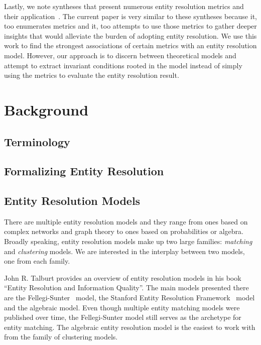 \documentclass[journal]{IEEEtran}
\begin{document}
    Lastly, we note syntheses that present numerous entity resolution metrics
    and their application~\cite{hitesh2012,graf2021frost,barnes2015practioner}.
    The current paper is very similar to these syntheses because it, too
    enumerates metrics and it, too attempts to use those metrics to gather
    deeper insights that would alleviate the burden of adopting entity
    resolution.
    We use this work to find the strongest associations of certain metrics with
    an entity resolution model.
    However, our approach is to discern between theoretical models and attempt
    to extract invariant conditions rooted in the model instead of simply using
    the metrics to evaluate the entity resolution result.

    \section{Background}\label{sec:Theoretical Background}
    \subsection{Terminology}\label{sec:Terminology}
    
    
    \subsection{Formalizing Entity Resolution}\label{sec:Entity Resolution Formalization}
    

    \subsection{Entity Resolution Models}\label{subsec:Entity Resolution Models}

    There are multiple entity resolution models and they range from ones based
    on complex networks and graph theory\cite{Li2020} to ones based on
    probabilities\cite{fs1969} or algebra\cite{Tal11,Ben2009Swoosh}.
    Broadly speaking, entity resolution models make up two large families:
    \textit{matching} and \textit{clustering} models.
    We are interested in the interplay between two models, one from each family.

    John R. Talburt provides an overview of entity resolution models in his book
    ``Entity Resolution and Information Quality''\cite{Tal11}.
    The main models presented there are the Fellegi-Sunter~\cite{fs1969} model,
    the Stanford Entity Resolution Framework~\cite{Ben2009Swoosh} model and the
    algebraic\cite{tal2007algebraic} model.
    Even though multiple entity matching models were published over time, the
    Fellegi-Sunter model still serves as the archetype for entity matching.
    The algebraic entity resolution model is the easiest to work with from the
    family of clustering models.
\end{document}
